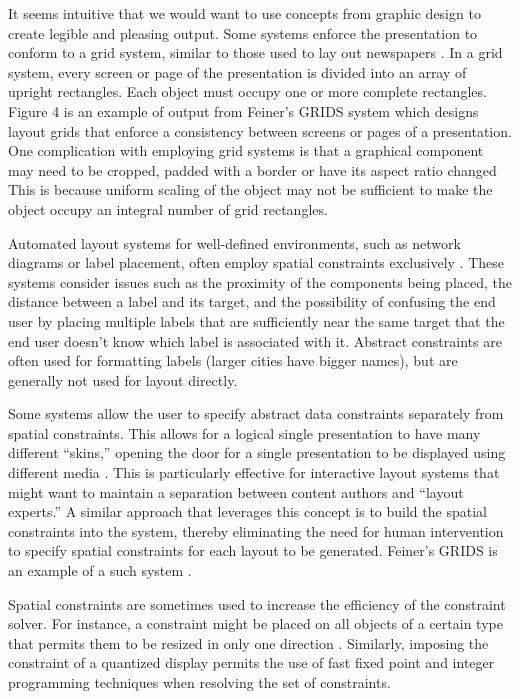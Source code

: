       It seems intuitive that we would want to use concepts from graphic design
      to create legible and pleasing output. Some systems enforce the
      presentation to conform to a grid system, similar to those used to lay out
      newspapers \citep{muller-1,hurlburt-1}. In a grid system, every screen or
      page of the presentation is divided into an array of upright rectangles.
      Each object must occupy one or more complete rectangles. Figure 4 is an
      example of output from Feiner’s GRIDS system \citep{feiner-1} which designs
      layout grids that enforce a consistency between screens or pages of a
      presentation. One complication with employing grid systems is that a
      graphical component may need to be cropped, padded with a border or have
      its aspect ratio changed This is because uniform scaling of the object may
      not be sufficient to make the object occupy an integral number of grid
      rectangles.

      Automated layout systems for well-defined environments, such as network
      diagrams or label placement, often employ spatial constraints exclusively
      \citep{kosak-1,christensen-1}. These systems consider issues such as the
      proximity of the components being placed, the distance between a label and
      its target, and the possibility of confusing the end user by placing
      multiple labels that are sufficiently near the same target that the end
      user doesn’t know which label is associated with it. Abstract constraints
      are often used for formatting labels (larger cities have bigger names), but
      are generally not used for layout directly.

      Some systems allow the user to specify abstract data constraints separately
      from spatial constraints. This allows for a logical single presentation to
      have many different “skins,” opening the door for a single presentation to
      be displayed using different media \citep{weitzman-2}. This is particularly
      effective for interactive layout systems that might want to maintain a
      separation between content authors and “layout experts.” A similar approach
      that leverages this concept is to build the spatial constraints into the
      system, thereby eliminating the need for human intervention to specify
      spatial constraints for each layout to be generated. Feiner’s GRIDS is an
      example of a such system \citep{feiner-1}.

      Spatial constraints are sometimes used to increase the efficiency of the
      constraint solver. For instance, a constraint might be placed on all
      objects of a certain type that permits them to be resized in only one
      direction \citep{linton-1}. Similarly, imposing the constraint of a
      quantized display permits the use of fast fixed point and integer
      programming techniques when resolving the set of constraints.

